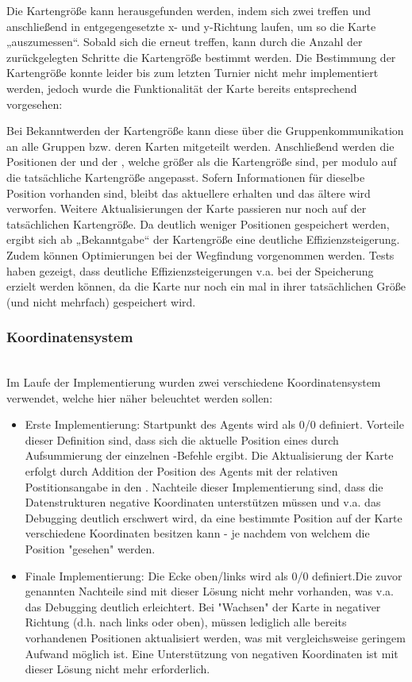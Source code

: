 Die Kartengröße kann herausgefunden werden, indem sich zwei \Agents treffen und anschließend in entgegengesetzte x- und y-Richtung laufen, um so die Karte „auszumessen“. Sobald sich die \Agents erneut treffen, kann durch die Anzahl der zurückgelegten Schritte die Kartengröße bestimmt werden. Die Bestimmung der Kartengröße konnte leider bis zum letzten Turnier nicht mehr implementiert werden, jedoch wurde die Funktionalität der Karte bereits entsprechend vorgesehen: \newline

Bei Bekanntwerden der Kartengröße kann diese über die Gruppenkommunikation an alle Gruppen bzw. deren Karten mitgeteilt werden. Anschließend werden die Positionen der \NextMapTiles und der \Agents, welche größer als die Kartengröße sind, per modulo auf die tatsächliche Kartengröße angepasst. Sofern Informationen für dieselbe Position vorhanden sind, bleibt das aktuellere \NextMapTile erhalten und das ältere wird verworfen. Weitere Aktualisierungen der Karte passieren nur noch auf der tatsächlichen Kartengröße. Da deutlich weniger Positionen gespeichert werden, ergibt sich ab „Bekanntgabe“ der Kartengröße eine deutliche Effizienzsteigerung. Zudem können Optimierungen bei der Wegfindung vorgenommen werden. Tests haben gezeigt, dass deutliche Effizienzsteigerungen v.a. bei der Speicherung erzielt werden können, da die Karte nur noch ein mal in ihrer tatsächlichen Größe (und nicht mehrfach) gespeichert wird.  

\subsubsection{Koordinatensystem} ~\\
Im Laufe der Implementierung wurden zwei verschiedene Koordinatensystem verwendet, welche hier näher beleuchtet werden sollen: 
\begin{itemize}
\item Erste Implementierung: Startpunkt des Agents wird als 0/0 definiert. \newline Vorteile dieser Definition sind, dass sich die aktuelle Position eines \Agents durch Aufsummierung der einzelnen \move-Befehle ergibt. Die Aktualisierung der Karte erfolgt durch Addition der Position des Agents mit der relativen Postitionsangabe in den \Percepts. Nachteile dieser Implementierung sind, dass die Datenstrukturen negative Koordinaten unterstützen müssen und v.a. das Debugging deutlich erschwert wird, da eine bestimmte Position auf der Karte verschiedene Koordinaten besitzen kann - je nachdem von welchem \Agent die Position "gesehen" werden. 
\item Finale Implementierung: Die Ecke oben/links wird als 0/0 definiert.\newline Die zuvor genannten Nachteile sind mit dieser Lösung nicht mehr vorhanden, was v.a. das Debugging deutlich erleichtert. Bei "Wachsen" der Karte in negativer Richtung (d.h. nach links oder oben), müssen lediglich alle bereits vorhandenen Positionen aktualisiert werden, was mit vergleichsweise geringem Aufwand möglich ist. Eine Unterstützung von negativen Koordinaten ist mit dieser Lösung nicht mehr erforderlich. 
\end{itemize}

